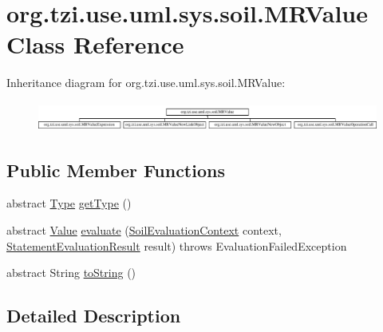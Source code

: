 \hypertarget{classorg_1_1tzi_1_1use_1_1uml_1_1sys_1_1soil_1_1_m_r_value}{\section{org.\-tzi.\-use.\-uml.\-sys.\-soil.\-M\-R\-Value Class Reference}
\label{classorg_1_1tzi_1_1use_1_1uml_1_1sys_1_1soil_1_1_m_r_value}
}
Inheritance diagram for org.\-tzi.\-use.\-uml.\-sys.\-soil.\-M\-R\-Value\-:\begin{figure}[H]
\begin{center}
\leavevmode
\includegraphics[height=0.968858cm]{classorg_1_1tzi_1_1use_1_1uml_1_1sys_1_1soil_1_1_m_r_value}
\end{center}
\end{figure}
\subsection*{Public Member Functions}
\begin{DoxyCompactItemize}
\item 
abstract \hyperlink{interfaceorg_1_1tzi_1_1use_1_1uml_1_1ocl_1_1type_1_1_type}{Type} \hyperlink{classorg_1_1tzi_1_1use_1_1uml_1_1sys_1_1soil_1_1_m_r_value_a79a482740f310a8b1be49acb2f54f38f}{get\-Type} ()
\item 
abstract \hyperlink{classorg_1_1tzi_1_1use_1_1uml_1_1ocl_1_1value_1_1_value}{Value} \hyperlink{classorg_1_1tzi_1_1use_1_1uml_1_1sys_1_1soil_1_1_m_r_value_ada00027aa4a2b33682efef0030e0d050}{evaluate} (\hyperlink{classorg_1_1tzi_1_1use_1_1uml_1_1sys_1_1soil_1_1_soil_evaluation_context}{Soil\-Evaluation\-Context} context, \hyperlink{classorg_1_1tzi_1_1use_1_1uml_1_1sys_1_1_statement_evaluation_result}{Statement\-Evaluation\-Result} result)  throws Evaluation\-Failed\-Exception
\item 
abstract String \hyperlink{classorg_1_1tzi_1_1use_1_1uml_1_1sys_1_1soil_1_1_m_r_value_abf2fa1d08a953cd447192705341a90b0}{to\-String} ()
\end{DoxyCompactItemize}


\subsection{Detailed Description}


